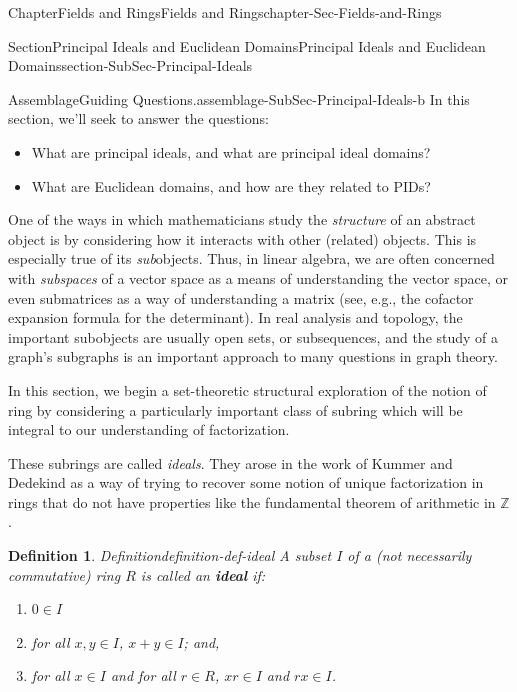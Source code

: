 \documentclass[oneside,10pt,]{book}
\newcommand{\terminology}[1]{\textbf{#1}}
\numberwithin{equation}{section}
\def\Z{{\mathbb Z}}
\newtheorem{definition}[theorem]{Definition}
\begin{document}
\begin{chapterptx}{Chapter}{Fields and Rings}{}{Fields and Rings}{}{}{chapter-Sec-Fields-and-Rings}
\typeout{************************************************}
%
\begin{sectionptx}{Section}{Principal Ideals and Euclidean Domains}{}{Principal Ideals and Euclidean Domains}{}{}{section-SubSec-Principal-Ideals}
\begin{assemblage}{Assemblage}{Guiding Questions.}{assemblage-SubSec-Principal-Ideals-b}%
In this section, we'll seek to answer the questions: %
\begin{itemize}[label=\textbullet]
\item{}What are principal ideals, and what are principal ideal domains?%
\item{}What are Euclidean domains, and how are they related to PIDs?%
\end{itemize}
%
\end{assemblage}
One of the ways in which mathematicians study the \emph{structure} of an abstract object is by considering how it interacts with other (related) objects. This is especially true of its \emph{sub}objects. Thus, in linear algebra, we are often concerned with \emph{subspaces} of a vector space as a means of understanding the vector space, or even submatrices as a way of understanding a matrix (see, e.g., the cofactor expansion formula for the determinant). In real analysis and topology, the important subobjects are usually open sets, or subsequences, and the study of a graph's subgraphs is an important approach to many questions in graph theory.%
\par
In this section, we begin a set-theoretic structural exploration of the notion of ring by considering a particularly important class of subring which will be integral to our understanding of factorization.%
\par
These subrings are called \emph{ideals}. They arose in the work of Kummer and Dedekind as a way of trying to recover some notion of unique factorization in rings that do not have properties like the fundamental theorem of arithmetic in \(\Z\).%
\begin{definition}{Definition}{}{definition-def-ideal}%
A subset \(I\) of a (not necessarily commutative) ring \(R\) is called an \terminology{ideal} if:%
\begin{enumerate}
\item{}\(\displaystyle 0\in I\)%
\item{}for all \(x,y\in I\), \(x+y\in I\); and,%
\item{}for all \(x\in I\) and for all \(r\in R\), \(xr\in I\) and \(rx\in I\).%

\end{enumerate}
\end{definition}
\end{sectionptx}
\end{chapterptx}
\end{document}
